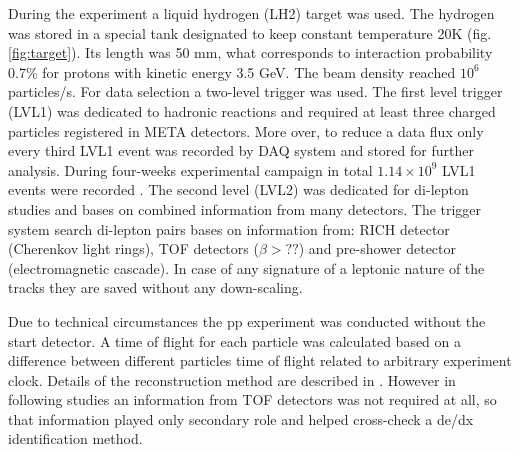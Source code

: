 During the experiment a liquid hydrogen (LH2) target was used. The hydrogen was stored in a special tank designated to keep constant temperature 20K (fig. \ref{fig:target}). Its length was 50 mm, what corresponds to interaction probability 0.7\% for protons with kinetic energy 3.5 GeV. The beam density reached $10^6$ particles/s. For data selection a two-level trigger was used. The first level trigger (LVL1) was dedicated to hadronic reactions and required at least three charged particles registered in META detectors. More over, to reduce a data flux only every third LVL1 event was recorded by DAQ system and stored for further analysis. During four-weeks experimental campaign in total $1.14 \times 10^9$ LVL1 events were recorded \cite{hades_inclL_35}. The second level (LVL2) was dedicated for di-lepton studies and bases on combined information from many detectors. The trigger system search di-lepton pairs bases on information from: RICH detector (Cherenkov light rings), TOF detectors ($\beta>??$) and pre-shower detector (electromagnetic cascade)\cite{Agakishiev:2009am,hades_DAQ}. In case of any signature of a leptonic nature of the tracks they are saved without any down-scaling.

Due to technical circumstances the pp experiment was conducted without the start detector. A time of flight for each particle was calculated based on a difference between different particles time of flight related to arbitrary experiment clock. Details of the reconstruction method are described in \cite{dybczak_phd}. However in following studies an information from TOF detectors was not required at all, so that information played only secondary role and helped cross-check a de/dx identification method.
